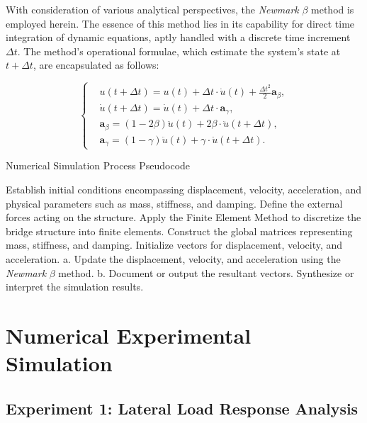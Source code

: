 \documentclass[conference]{IEEEtran}
\begin{document}
With consideration of various analytical perspectives, the \textit{Newmark} \( \beta \) method is employed herein.\cite{pourzeynali2021comprehensive} The essence of this method lies in its capability for direct time integration of dynamic equations, aptly handled with a discrete time increment \( \Delta t \). The method's operational formulae, which estimate the system's state at \( t + \Delta t \), are encapsulated as follows:

\begin{equation}
\left\{
\begin{aligned}
& u(t + \Delta t) = u(t) + \Delta t \cdot \dot{u}(t) + \frac{\Delta t^2}{2} \mathbf{a}_{\beta}, \\
& \dot{u}(t + \Delta t) = \dot{u}(t) + \Delta t \cdot \mathbf{a}_{\gamma}, \\
& \mathbf{a}_{\beta} = (1 - 2\beta)\ddot{u}(t) + 2\beta \cdot \ddot{u}(t + \Delta t), \\
& \mathbf{a}_{\gamma} = (1 - \gamma)\ddot{u}(t) + \gamma \cdot \ddot{u}(t + \Delta t).
\end{aligned}
\right.
\end{equation}

\begin{algorithm}
\caption{Numerical Simulation Process Pseudocode}
\begin{algorithmic}[1]
\State Establish initial conditions encompassing displacement, velocity, acceleration, and physical parameters such as mass, stiffness, and damping.
\State Define the external forces acting on the structure.
\State Apply the Finite Element Method to discretize the bridge structure into finite elements.
\State Construct the global matrices representing mass, stiffness, and damping.
\State Initialize vectors for displacement, velocity, and acceleration.
    \State a. Update the displacement, velocity, and acceleration using the \textit{Newmark} \( \beta \) method.
    \State b. Document or output the resultant vectors.
\EndFor
\State Synthesize or interpret the simulation results.
\end{algorithmic}
\end{algorithm}


\section{Numerical Experimental Simulation}
\subsection{Experiment 1: Lateral Load Response Analysis}
\end{document}
